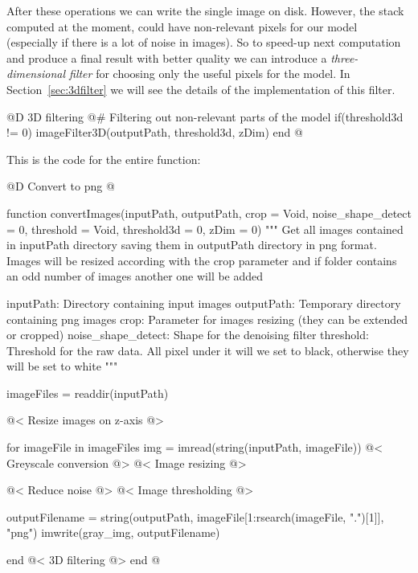 \documentclass[11pt,oneside]{article}	%
\begin{document}
After these operations we can write the single image on disk. However, the stack computed at the moment, could have non-relevant pixels for our model (especially if there is a lot of noise in images). So to speed-up next computation and produce a final result with better quality we can introduce a \textit{three-dimensional filter} for choosing only the useful pixels for the model. In Section~\ref{sec:3dfilter} we will see the details of the implementation of this filter.

@D 3D filtering
@{# Filtering out non-relevant parts of the model
if(threshold3d != 0)
  imageFilter3D(outputPath, threshold3d, zDim)
end @}

This is the code for the entire function:

@D Convert to png
@{function convertImages(inputPath, outputPath,
                       crop = Void, noise_shape_detect = 0, threshold = Void,
                       threshold3d = 0, zDim = 0)
  """
  Get all images contained in inputPath directory
  saving them in outputPath directory in png format.
  Images will be resized according with the crop parameter
  and if folder contains an odd number of images another one will be
  added

  inputPath: Directory containing input images
  outputPath: Temporary directory containing png images
  crop: Parameter for images resizing (they can be
        extended or cropped)
  noise_shape_detect: Shape for the denoising filter
  threshold: Threshold for the raw data. All pixel under it
             will we set to black, otherwise they will be set to white
  """

  imageFiles = readdir(inputPath)
  
  @< Resize images on z-axis @>
  
  for imageFile in imageFiles
    img = imread(string(inputPath, imageFile))
    @< Greyscale conversion @>
    @< Image resizing @>
    
    @< Reduce noise @>
    @< Image thresholding @>
   
   outputFilename = string(outputPath, imageFile[1:rsearch(imageFile, ".")[1]], "png")
   imwrite(gray_img, outputFilename)

  end
  @< 3D filtering @>
end
@}
\end{document}
